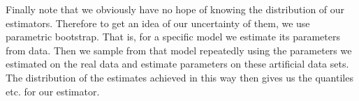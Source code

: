 Finally note that we obviously have no hope of knowing the distribution of our estimators. Therefore to get an idea of our uncertainty of them, we use parametric bootstrap. That is, for a specific model we estimate its parameters from data. Then we sample from that model repeatedly using the parameters we estimated on the real data and estimate parameters on these artificial data sets. The distribution of the estimates achieved in this way then gives us the quantiles etc. for our estimator.